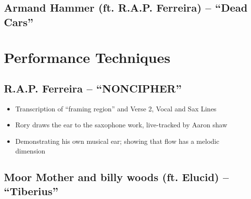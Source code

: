 \subsection*{\centering Armand Hammer (ft. R.A.P. Ferreira) -- ``Dead Cars''}

\section{Performance Techniques}
\subsection*{\centering R.A.P. Ferreira -- ``NONCIPHER''}
    \begin{itemize}
        \item Transcription of ``framing region'' and Verse 2, Vocal and Sax Lines
        \item Rory draws the ear to the saxophone work, live-tracked by Aaron shaw
        \item Demonstrating his own musical ear; showing that flow has a melodic dimension
    \end{itemize}
  
\subsection*{\centering Moor Mother and billy woods (ft. Elucid)  -- ``Tiberius''}

